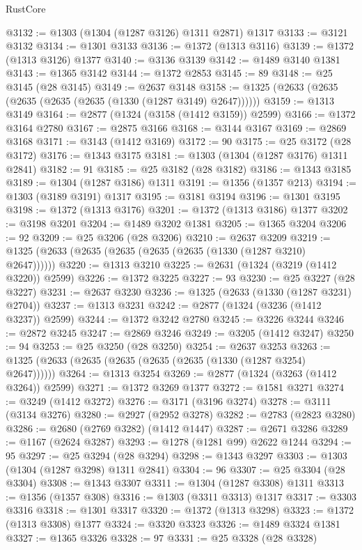 \begin{lexlean}{RustCore}
\begin{coremodule}
@3132 := @1303 (@1304 (@1287 @3126) @1311 @2871) @1317
@3133 := @3121 @3132
@3134 := @1301 @3133
@3136 := @1372 (@1313 @3116)
@3139 := @1372 (@1313 @3126) @1377
@3140 := @3136 @3139
@3142 := @1489 @3140 @1381
@3143 := @1365 @3142
@3144 := @1372 @2853
@3145 := 89
@3148 := @25 @3145 (@28 @3145)
@3149 := @2637 @3148
@3158 := @1325 (@2633 (@2635 (@2635 (@2635 (@2635 (@1330 (@1287 @3149) @2647))))))
@3159 := @1313 @3149
@3164 := @2877 (@1324 (@3158 (@1412 @3159)) @2599)
@3166 := @1372 @3164 @2780
@3167 := @2875 @3166
@3168 := @3144 @3167
@3169 := @2869 @3168
@3171 := @3143 (@1412 @3169)
@3172 := 90
@3175 := @25 @3172 (@28 @3172)
@3176 := @1343 @3175
@3181 := @1303 (@1304 (@1287 @3176) @1311 @2841)
@3182 := 91
@3185 := @25 @3182 (@28 @3182)
@3186 := @1343 @3185
@3189 := @1304 (@1287 @3186) @1311
@3191 := @1356 (@1357 @213)
@3194 := @1303 (@3189 @3191) @1317
@3195 := @3181 @3194
@3196 := @1301 @3195
@3198 := @1372 (@1313 @3176)
@3201 := @1372 (@1313 @3186) @1377
@3202 := @3198 @3201
@3204 := @1489 @3202 @1381
@3205 := @1365 @3204
@3206 := 92
@3209 := @25 @3206 (@28 @3206)
@3210 := @2637 @3209
@3219 := @1325 (@2633 (@2635 (@2635 (@2635 (@2635 (@1330 (@1287 @3210) @2647))))))
@3220 := @1313 @3210
@3225 := @2631 (@1324 (@3219 (@1412 @3220)) @2599)
@3226 := @1372 @3225
@3227 := 93
@3230 := @25 @3227 (@28 @3227)
@3231 := @2637 @3230
@3236 := @1325 (@2633 (@1330 (@1287 @3231) @2704))
@3237 := @1313 @3231
@3242 := @2877 (@1324 (@3236 (@1412 @3237)) @2599)
@3244 := @1372 @3242 @2780
@3245 := @3226 @3244
@3246 := @2872 @3245
@3247 := @2869 @3246
@3249 := @3205 (@1412 @3247)
@3250 := 94
@3253 := @25 @3250 (@28 @3250)
@3254 := @2637 @3253
@3263 := @1325 (@2633 (@2635 (@2635 (@2635 (@2635 (@1330 (@1287 @3254) @2647))))))
@3264 := @1313 @3254
@3269 := @2877 (@1324 (@3263 (@1412 @3264)) @2599)
@3271 := @1372 @3269 @1377
@3272 := @1581 @3271
@3274 := @3249 (@1412 @3272)
@3276 := @3171 (@3196 @3274)
@3278 := @3111 (@3134 @3276)
@3280 := @2927 (@2952 @3278)
@3282 := @2783 (@2823 @3280)
@3286 := @2680 (@2769 @3282) (@1412 @1447)
@3287 := @2671 @3286
@3289 := @1167 (@2624 @3287)
@3293 := @1278 (@1281 @99) @2622 @1244
@3294 := 95
@3297 := @25 @3294 (@28 @3294)
@3298 := @1343 @3297
@3303 := @1303 (@1304 (@1287 @3298) @1311 @2841)
@3304 := 96
@3307 := @25 @3304 (@28 @3304)
@3308 := @1343 @3307
@3311 := @1304 (@1287 @3308) @1311
@3313 := @1356 (@1357 @308)
@3316 := @1303 (@3311 @3313) @1317
@3317 := @3303 @3316
@3318 := @1301 @3317
@3320 := @1372 (@1313 @3298)
@3323 := @1372 (@1313 @3308) @1377
@3324 := @3320 @3323
@3326 := @1489 @3324 @1381
@3327 := @1365 @3326
@3328 := 97
@3331 := @25 @3328 (@28 @3328)

\end{coremodule}
\end{lexlean}
